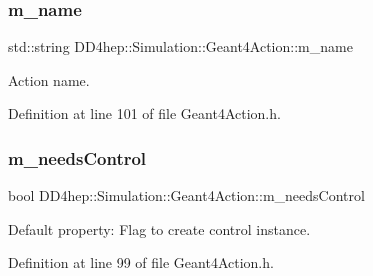 \subsubsection{\texorpdfstring{m\+\_\+name}{m\_name}}
{\footnotesize\ttfamily std\+::string D\+D4hep\+::\+Simulation\+::\+Geant4\+Action\+::m\+\_\+name\hspace{0.3cm}{\ttfamily [protected]}}



Action name. 



Definition at line 101 of file Geant4\+Action.\+h.

\hypertarget{class_d_d4hep_1_1_simulation_1_1_geant4_action_a4d64f5159d58c4a43d74d0ddd0a695ba}{}\label{class_d_d4hep_1_1_simulation_1_1_geant4_action_a4d64f5159d58c4a43d74d0ddd0a695ba} 
\subsubsection{\texorpdfstring{m\+\_\+needs\+Control}{m\_needsControl}}
{\footnotesize\ttfamily bool D\+D4hep\+::\+Simulation\+::\+Geant4\+Action\+::m\+\_\+needs\+Control\hspace{0.3cm}{\ttfamily [protected]}}



Default property\+: Flag to create control instance. 



Definition at line 99 of file Geant4\+Action.\+h.



